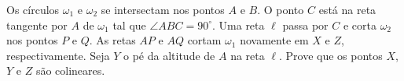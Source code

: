 Os círculos $\omega_1$ e $\omega_2$ se intersectam nos pontos $A$ e $B$. O ponto $C$ está na reta tangente por $A$ de $\omega_1$ tal que $\angle ABC = 90^\circ$.
Uma reta $\ell$ passa por $C$ e corta $\omega_2$ nos pontos $P$ e $Q$. As retas $AP$ e $AQ$ cortam $\omega_1$ novamente em $X$ e $Z$, respectivamente. Seja $Y$ o pé da altitude de $A$ na reta $\ell$. Prove que os pontos $X$, $Y$ e $Z$ são colineares.
